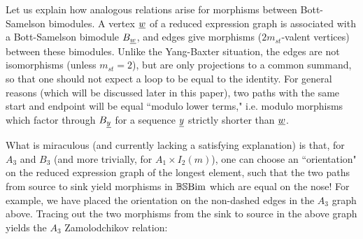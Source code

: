 Let us explain how analogous relations arise for morphisms between Bott-Samelson bimodules. A vertex $\underline{w}$ of a reduced expression graph is associated with a
Bott-Samelson bimodule $B_{\underline{w}}$, and edges give morphisms ($2m_{st}$-valent vertices) between these bimodules. Unlike the Yang-Baxter situation, the edges are not isomorphisms (unless
$m_{st}=2$), but are only projections to a common summand, so that one should not expect a loop to be equal to the identity. For general reasons (which will be discussed later in this
paper), two paths with the same start and endpoint will be equal ``modulo lower terms," i.e. modulo morphisms which factor through $B_{\underline{y}}$ for a sequence $\underline{y}$ strictly shorter than $\underline{w}$.

What is miraculous (and currently lacking a satisfying explanation) is that, for $A_3$ and $B_3$ (and more trivially, for $A_1 \times I_2(m)$), one can choose an ``orientation" on the
reduced expression graph of the longest element, such that the two paths from source to sink yield morphisms in $\mathbb{BS}\textrm{Bim}$ which are equal on the nose! For example, we have placed the orientation on the non-dashed edges in the $A_3$ graph above. Tracing out the two morphisms from the sink to source in the above graph yields the $A_3$
Zamolodchikov relation: 
% 
% 
% 
% 
% 
